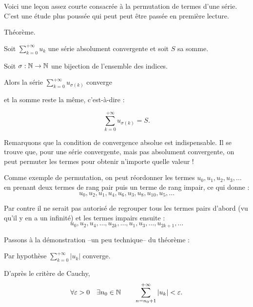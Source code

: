 






\debuttexte


\diapo

Voici une leçon assez courte consacrée à la permutation de termes d'une série. 
C'est une étude plus poussée qui peut peut être passée en première lecture.

\diapo

Théorème.

Soit $\displaystyle\sum_{k=0}^{+\infty} u_k$ une série absolument convergente et soit $S$ sa somme.

\change
Soit $\sigma : \mathbb{N} \to \mathbb{N}$ une bijection de l'ensemble des indices.

\change
Alors la série $\displaystyle \sum_{k=0}^{+\infty} u_{\sigma(k)}$ converge

\change
et la somme reste la même, c'est-à-dire :

$$\sum_{k=0}^{+\infty} u_{\sigma(k)} = S.$$

\change
Remarquons que la condition de convergence absolue est indispensable.
Il se trouve que, pour une série convergente, mais pas absolument convergente, 
on peut permuter les termes pour obtenir n'importe quelle valeur !

\diapo

Comme exemple de permutation, on peut réordonner les termes $u_0,u_1,u_2,u_3,\ldots$ 
en prenant deux termes de rang pair puis un terme de rang impair, ce qui donne :
$$u_0, u_2, u_1, u_4, u_6, u_3, u_8, u_{10}, u_5,\ldots$$

\change
Par contre il ne serait pas autorisé de regrouper tous les termes pairs d'abord (vu qu'il y en a un infinité) et 
les termes impairs ensuite :
$$u_0,u_2, u_4,\ldots, u_{2k},\ldots,u_1,u_3,\ldots, u_{2k+1},\ldots$$

\diapo

Passons à la démonstration --un peu technique-- du théorème :

Par hypothèse $\sum_{k=0}^{+\infty} |u_k|$ converge. 

\change
D'après le critère de Cauchy,
$$\forall \varepsilon>0\quad \exists n_0\in\mathbb{N} \qquad \sum_{n=n_0+1}^{+\infty} |u_k|<\varepsilon.$$

